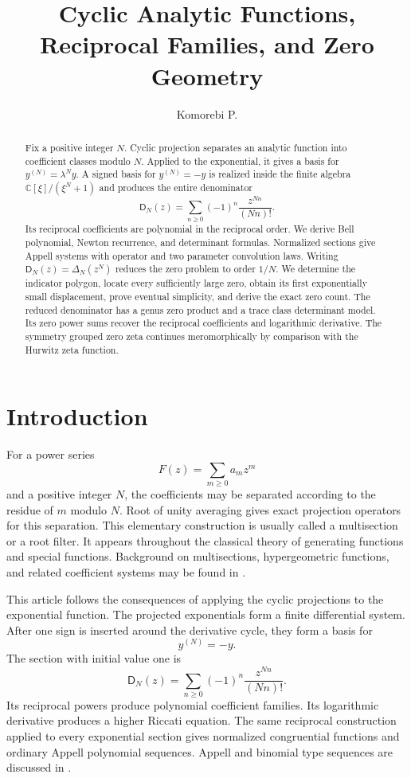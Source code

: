 \documentclass{aomart}
\title[Cyclic analytic functions]{Cyclic Analytic Functions, Reciprocal Families, and Zero Geometry}
\author[Komorebi P.]{Komorebi P.}
\theoremstyle{definition}
\theoremstyle{remark}
\newcommand{\CC}{\mathbb C}
\newcommand{\Dfun}{\mathsf D}
\begin{document}
\begin{abstract}
Fix a positive integer $N$.  Cyclic projection separates an analytic function into coefficient classes modulo $N$.  Applied to the exponential, it gives a basis for $y^{(N)}=\lambda^Ny$.  A signed basis for $y^{(N)}=-y$ is realized inside the finite algebra $\CC[\xi]/(\xi^N+1)$ and produces the entire denominator
\[
\Dfun_N(z)=\sum_{n\geq0}(-1)^n\frac{z^{Nn}}{(Nn)!}.
\]
Its reciprocal coefficients are polynomial in the reciprocal order.  We derive Bell polynomial, Newton recurrence, and determinant formulas.  Normalized sections give Appell systems with operator and two parameter convolution laws.  Writing $\Dfun_N(z)=\Delta_N(z^N)$ reduces the zero problem to order $1/N$.  We determine the indicator polygon, locate every sufficiently large zero, obtain its first exponentially small displacement, prove eventual simplicity, and derive the exact zero count.  The reduced denominator has a genus zero product and a trace class determinant model.  Its zero power sums recover the reciprocal coefficients and logarithmic derivative.  The symmetry grouped zero zeta continues meromorphically by comparison with the Hurwitz zeta function.
\end{abstract}
\maketitle
\thispagestyle{plain}

\section{Introduction}\label{sec:introduction}

For a power series
\[
F(z)=\sum_{m\geq 0}a_mz^m
\]
and a positive integer $N$, the coefficients may be separated according to the residue of $m$ modulo $N$.  Root of unity averaging gives exact projection operators for this separation.  This elementary construction is usually called a multisection or a root filter.  It appears throughout the classical theory of generating functions and special functions.  Background on multisections, hypergeometric functions, and related coefficient systems may be found in \cite{Rainville1960,AndrewsAskeyRoy1999,Comtet1974}.

This article follows the consequences of applying the cyclic projections to the exponential function.  The projected exponentials form a finite differential system.  After one sign is inserted around the derivative cycle, they form a basis for
\[
y^{(N)}=-y.
\]
The section with initial value one is
\[
\Dfun_N(z)=\sum_{n\geq 0}(-1)^n\frac{z^{Nn}}{(Nn)!}.
\]
Its reciprocal powers produce polynomial coefficient families.  Its logarithmic derivative produces a higher Riccati equation.  The same reciprocal construction applied to every exponential section gives normalized congruential functions and ordinary Appell polynomial sequences.  Appell and binomial type sequences are discussed in \cite{Roman1984,Comtet1974}.
\end{document}
